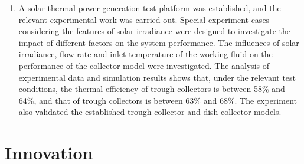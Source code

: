\begin{enumerate}[label=(\arabic*)]
	\item A solar thermal power generation test platform was established, and the relevant experimental work was carried out. Special experiment cases considering the features of solar irradiance were designed to investigate the impact of different factors on the system performance. The influences of solar irradiance, flow rate and inlet temperature of the working fluid on the performance of the collector model were investigated. The analysis of experimental data and simulation results shows that, under the relevant test conditions, the thermal efficiency of trough collectors is between 58\% and 64\%, and that of trough collectors is between 63\% and 68\%. The experiment also validated the established trough collector and dish collector models.
\end{enumerate}

\newpage
\section{Innovation}

